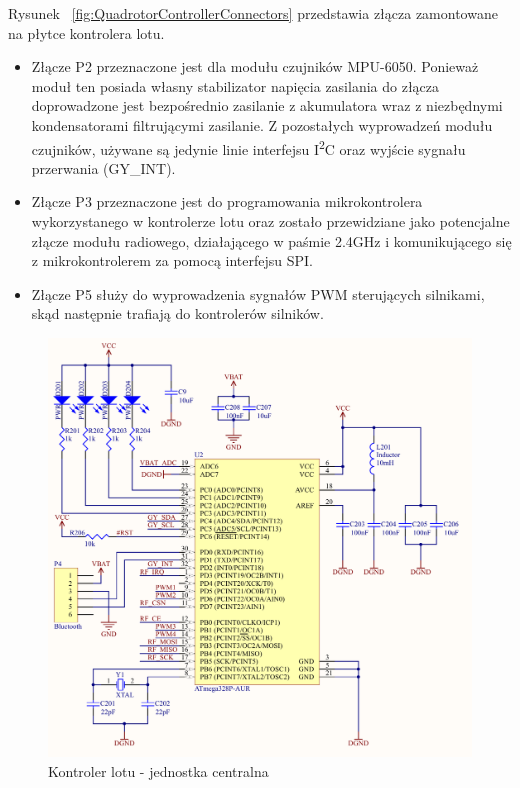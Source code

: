 Rysunek ~\ref{fig:QuadrotorControllerConnectors} przedstawia złącza zamontowane na płytce kontrolera lotu. 
\begin{itemize}
	\item Złącze P2 przeznaczone jest dla modułu czujników MPU-6050. Ponieważ moduł ten posiada własny stabilizator napięcia zasilania do złącza doprowadzone jest bezpośrednio zasilanie z akumulatora wraz z niezbędnymi kondensatorami filtrującymi zasilanie. Z pozostałych wyprowadzeń modułu czujników, używane są jedynie linie interfejsu I\textsuperscript{2}C oraz wyjście sygnału przerwania (GY\_INT).
	\item Złącze P3 przeznaczone jest do programowania mikrokontrolera wykorzystanego w kontrolerze lotu oraz zostało przewidziane jako potencjalne złącze modułu radiowego, działającego w paśmie 2.4GHz i komunikującego się z mikrokontrolerem za pomocą interfejsu SPI.  
	\item Złącze P5 służy do wyprowadzenia sygnałów PWM sterujących silnikami, skąd następnie trafiają do kontrolerów silników.
\end{itemize}

\begin{figure}[H]
	\centering
	\includegraphics[scale=0.37]{Pictures/QuadroController_Main_C.png}
		\caption[Kontroler lotu - jednostka centralna]{Kontroler lotu - jednostka centralna}
	\label{fig:QuadrotorControllerMain}
\end{figure}

